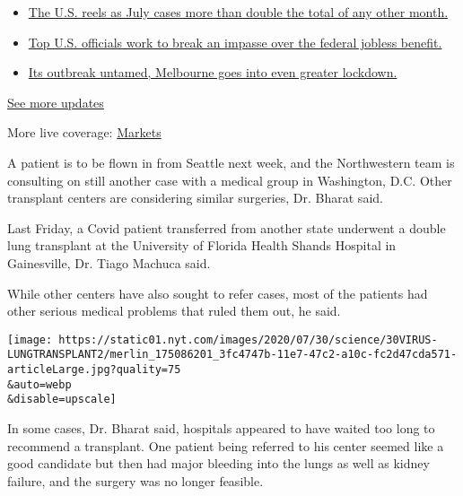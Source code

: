 \begin{itemize}
\tightlist
\item
  \href{https://www.nytimes.com/2020/08/01/world/coronavirus-covid-19.html?action=click\&pgtype=Article\&state=default\&region=MAIN_CONTENT_1\&context=storylines_live_updates\#link-34047410}{The
  U.S. reels as July cases more than double the total of any other
  month.}
\item
  \href{https://www.nytimes.com/2020/08/01/world/coronavirus-covid-19.html?action=click\&pgtype=Article\&state=default\&region=MAIN_CONTENT_1\&context=storylines_live_updates\#link-780ec966}{Top
  U.S. officials work to break an impasse over the federal jobless
  benefit.}
\item
  \href{https://www.nytimes.com/2020/08/01/world/coronavirus-covid-19.html?action=click\&pgtype=Article\&state=default\&region=MAIN_CONTENT_1\&context=storylines_live_updates\#link-2bc8948}{Its
  outbreak untamed, Melbourne goes into even greater lockdown.}
\end{itemize}

\href{https://www.nytimes.com/2020/08/01/world/coronavirus-covid-19.html?action=click\&pgtype=Article\&state=default\&region=MAIN_CONTENT_1\&context=storylines_live_updates}{See
more updates}

More live coverage:
\href{https://www.nytimes.com/live/2020/07/31/business/stock-market-today-coronavirus?action=click\&pgtype=Article\&state=default\&region=MAIN_CONTENT_1\&context=storylines_live_updates}{Markets}

A patient is to be flown in from Seattle next week, and the Northwestern
team is consulting on still another case with a medical group in
Washington, D.C. Other transplant centers are considering similar
surgeries, Dr. Bharat said.

Last Friday, a Covid patient transferred from another state underwent a
double lung transplant at the University of Florida Health Shands
Hospital in Gainesville, Dr. Tiago Machuca said.

While other centers have also sought to refer cases, most of the
patients had other serious medical problems that ruled them out, he
said.

\texttt{[image: https://static01.nyt.com/images/2020/07/30/science/30VIRUS-LUNGTRANSPLANT2/merlin\_175086201\_3fc4747b-11e7-47c2-a10c-fc2d47cda571-articleLarge.jpg?quality=75\\\&auto=webp\\\&disable=upscale]}

In some cases, Dr. Bharat said, hospitals appeared to have waited too
long to recommend a transplant. One patient being referred to his center
seemed like a good candidate but then had major bleeding into the lungs
as well as kidney failure, and the surgery was no longer feasible.

